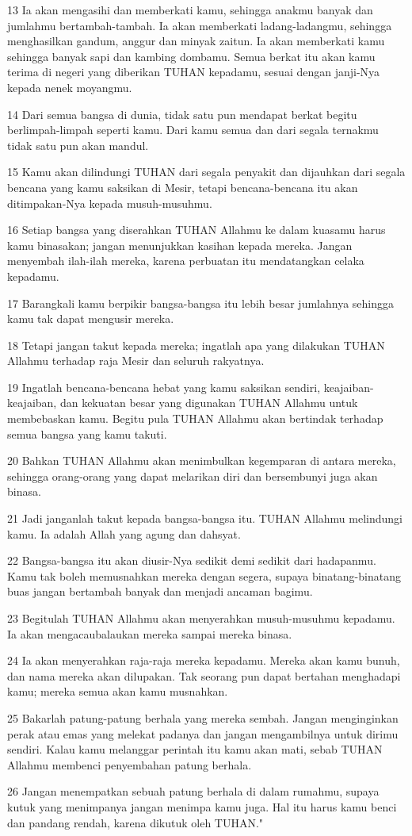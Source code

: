 \par 13 Ia akan mengasihi dan memberkati kamu, sehingga anakmu banyak dan jumlahmu bertambah-tambah. Ia akan memberkati ladang-ladangmu, sehingga menghasilkan gandum, anggur dan minyak zaitun. Ia akan memberkati kamu sehingga banyak sapi dan kambing dombamu. Semua berkat itu akan kamu terima di negeri yang diberikan TUHAN kepadamu, sesuai dengan janji-Nya kepada nenek moyangmu.
\par 14 Dari semua bangsa di dunia, tidak satu pun mendapat berkat begitu berlimpah-limpah seperti kamu. Dari kamu semua dan dari segala ternakmu tidak satu pun akan mandul.
\par 15 Kamu akan dilindungi TUHAN dari segala penyakit dan dijauhkan dari segala bencana yang kamu saksikan di Mesir, tetapi bencana-bencana itu akan ditimpakan-Nya kepada musuh-musuhmu.
\par 16 Setiap bangsa yang diserahkan TUHAN Allahmu ke dalam kuasamu harus kamu binasakan; jangan menunjukkan kasihan kepada mereka. Jangan menyembah ilah-ilah mereka, karena perbuatan itu mendatangkan celaka kepadamu.
\par 17 Barangkali kamu berpikir bangsa-bangsa itu lebih besar jumlahnya sehingga kamu tak dapat mengusir mereka.
\par 18 Tetapi jangan takut kepada mereka; ingatlah apa yang dilakukan TUHAN Allahmu terhadap raja Mesir dan seluruh rakyatnya.
\par 19 Ingatlah bencana-bencana hebat yang kamu saksikan sendiri, keajaiban-keajaiban, dan kekuatan besar yang digunakan TUHAN Allahmu untuk membebaskan kamu. Begitu pula TUHAN Allahmu akan bertindak terhadap semua bangsa yang kamu takuti.
\par 20 Bahkan TUHAN Allahmu akan menimbulkan kegemparan di antara mereka, sehingga orang-orang yang dapat melarikan diri dan bersembunyi juga akan binasa.
\par 21 Jadi janganlah takut kepada bangsa-bangsa itu. TUHAN Allahmu melindungi kamu. Ia adalah Allah yang agung dan dahsyat.
\par 22 Bangsa-bangsa itu akan diusir-Nya sedikit demi sedikit dari hadapanmu. Kamu tak boleh memusnahkan mereka dengan segera, supaya binatang-binatang buas jangan bertambah banyak dan menjadi ancaman bagimu.
\par 23 Begitulah TUHAN Allahmu akan menyerahkan musuh-musuhmu kepadamu. Ia akan mengacaubalaukan mereka sampai mereka binasa.
\par 24 Ia akan menyerahkan raja-raja mereka kepadamu. Mereka akan kamu bunuh, dan nama mereka akan dilupakan. Tak seorang pun dapat bertahan menghadapi kamu; mereka semua akan kamu musnahkan.
\par 25 Bakarlah patung-patung berhala yang mereka sembah. Jangan menginginkan perak atau emas yang melekat padanya dan jangan mengambilnya untuk dirimu sendiri. Kalau kamu melanggar perintah itu kamu akan mati, sebab TUHAN Allahmu membenci penyembahan patung berhala.
\par 26 Jangan menempatkan sebuah patung berhala di dalam rumahmu, supaya kutuk yang menimpanya jangan menimpa kamu juga. Hal itu harus kamu benci dan pandang rendah, karena dikutuk oleh TUHAN."

